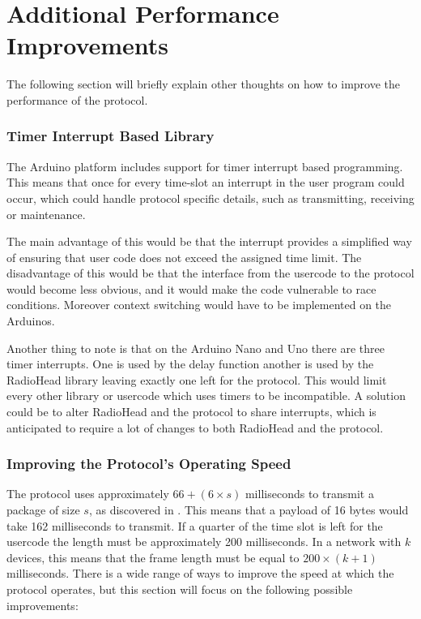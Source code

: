\section{Additional Performance Improvements}
The following section will briefly explain other thoughts on how to improve the performance of the protocol.
\vspace{-8pt}
\subsubsection{Timer Interrupt Based Library} 
\vspace{-6pt}
The Arduino platform includes support for timer interrupt based programming.
This means that once for every time-slot an interrupt in the user program could occur, which could handle protocol specific details, such as transmitting, receiving or maintenance.

The main advantage of this would be that the interrupt provides a simplified way of ensuring that user code does not exceed the assigned time limit.
The disadvantage of this would be that the interface from the usercode to the protocol would become less obvious, and it would make the code vulnerable to race conditions.
Moreover context switching would have to be implemented on the Arduinos.

Another thing to note is that on the Arduino Nano and Uno there are three timer interrupts.
One is used by the delay function another is used by the RadioHead library leaving exactly one left for the protocol.
This would limit every other library or usercode which uses timers to be incompatible.
A solution could be to alter RadioHead and the protocol to share interrupts, which is anticipated to require a lot of changes to both RadioHead and the protocol.
\vspace{-8pt}
\subsubsection{Improving the Protocol's Operating Speed}
\vspace{-6pt} 
The protocol uses approximately $66 + (6 \times s)$ milliseconds to transmit a package of size $s$, as discovered in  . 
This means that a payload of 16 bytes would take 162 milliseconds to transmit.
If a quarter of the time slot is left for the usercode the length must be approximately 200 milliseconds.
In a network with $k$ devices, this means that the frame length must be equal to $200 \times (k + 1)$ milliseconds.
There is a wide range of ways to improve the speed at which the protocol operates, but this section will focus on the following possible improvements:

